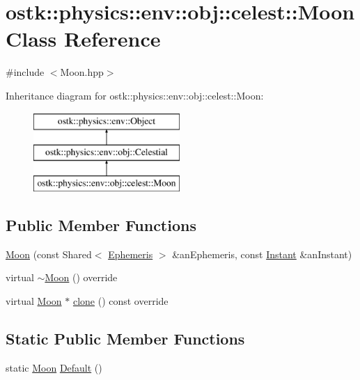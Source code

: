 \hypertarget{classostk_1_1physics_1_1env_1_1obj_1_1celest_1_1_moon}{}\section{ostk\+:\+:physics\+:\+:env\+:\+:obj\+:\+:celest\+:\+:Moon Class Reference}
\label{classostk_1_1physics_1_1env_1_1obj_1_1celest_1_1_moon}


{\ttfamily \#include $<$Moon.\+hpp$>$}

Inheritance diagram for ostk\+:\+:physics\+:\+:env\+:\+:obj\+:\+:celest\+:\+:Moon\+:\begin{figure}[H]
\begin{center}
\leavevmode
\includegraphics[height=3.000000cm]{classostk_1_1physics_1_1env_1_1obj_1_1celest_1_1_moon}
\end{center}
\end{figure}
\subsection*{Public Member Functions}
\begin{DoxyCompactItemize}
\item 
\hyperlink{classostk_1_1physics_1_1env_1_1obj_1_1celest_1_1_moon_ad8fdde672c99f064ea7ad3e6d3d8451c}{Moon} (const Shared$<$ \hyperlink{classostk_1_1physics_1_1env_1_1_ephemeris}{Ephemeris} $>$ \&an\+Ephemeris, const \hyperlink{classostk_1_1physics_1_1time_1_1_instant}{Instant} \&an\+Instant)
\item 
virtual \hyperlink{classostk_1_1physics_1_1env_1_1obj_1_1celest_1_1_moon_ad7c6677716956e7175798afa5f3bd9d4}{$\sim$\+Moon} () override
\item 
virtual \hyperlink{classostk_1_1physics_1_1env_1_1obj_1_1celest_1_1_moon}{Moon} $\ast$ \hyperlink{classostk_1_1physics_1_1env_1_1obj_1_1celest_1_1_moon_adcfeda7b73d32df67f5b38c05ca9351a}{clone} () const override
\end{DoxyCompactItemize}
\subsection*{Static Public Member Functions}
\begin{DoxyCompactItemize}
\item 
static \hyperlink{classostk_1_1physics_1_1env_1_1obj_1_1celest_1_1_moon}{Moon} \hyperlink{classostk_1_1physics_1_1env_1_1obj_1_1celest_1_1_moon_a20b7b36974130f942a113b05c4544a03}{Default} ()
\end{DoxyCompactItemize}
